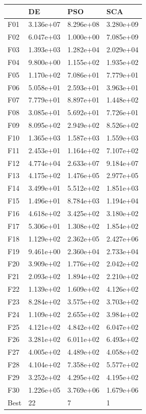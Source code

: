 \begin{tabular}{llll}
\toprule
{} &         DE &        PSO &        SCA \\
\midrule
F01  &  3.136e+07 &  8.296e+08 &  3.280e+09 \\
F02  &  6.047e+03 &  1.000e+00 &  7.085e+09 \\
F03  &  1.393e+03 &  1.282e+04 &  2.029e+04 \\
F04  &  9.800e+00 &  1.155e+02 &  1.935e+02 \\
F05  &  1.170e+02 &  7.086e+01 &  7.779e+01 \\
F06  &  5.058e+01 &  2.593e+01 &  3.963e+01 \\
F07  &  7.779e+01 &  8.897e+01 &  1.448e+02 \\
F08  &  3.085e+01 &  5.692e+01 &  7.726e+01 \\
F09  &  8.095e+02 &  2.949e+02 &  8.526e+02 \\
F10  &  1.365e+03 &  1.587e+03 &  1.559e+03 \\
F11  &  2.453e+01 &  1.164e+02 &  7.107e+02 \\
F12  &  4.774e+04 &  2.633e+07 &  9.184e+07 \\
F13  &  4.175e+02 &  1.476e+05 &  2.977e+05 \\
F14  &  3.499e+01 &  5.512e+02 &  1.851e+03 \\
F15  &  1.496e+01 &  8.784e+03 &  1.194e+04 \\
F16  &  4.618e+02 &  3.425e+02 &  3.180e+02 \\
F17  &  5.306e+01 &  1.308e+02 &  1.854e+02 \\
F18  &  1.129e+02 &  2.362e+05 &  2.427e+06 \\
F19  &  9.461e+00 &  2.360e+04 &  2.733e+04 \\
F20  &  3.909e+02 &  1.776e+02 &  2.042e+02 \\
F21  &  2.093e+02 &  1.894e+02 &  2.210e+02 \\
F22  &  1.139e+02 &  1.609e+02 &  4.126e+02 \\
F23  &  8.284e+02 &  3.575e+02 &  3.703e+02 \\
F24  &  1.109e+02 &  2.655e+02 &  3.984e+02 \\
F25  &  4.121e+02 &  4.842e+02 &  6.047e+02 \\
F26  &  3.281e+02 &  6.011e+02 &  6.493e+02 \\
F27  &  4.005e+02 &  4.489e+02 &  4.058e+02 \\
F28  &  4.104e+02 &  7.358e+02 &  5.577e+02 \\
F29  &  3.252e+02 &  4.295e+02 &  4.195e+02 \\
F30  &  1.226e+05 &  3.769e+06 &  1.679e+06 \\
Best &         22 &          7 &          1 \\
\bottomrule
\end{tabular}
